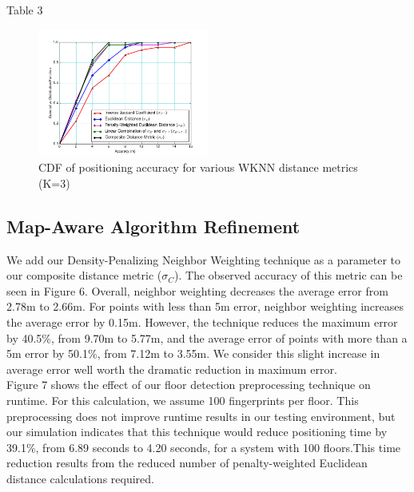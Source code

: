 \documentclass[conference]{IEEEtran}
\begin{document}
\begin{center}
Table 3
\end{center}

\begin{figure}[h!]
  \centering
    \includegraphics[width=0.5\textwidth]{distance_comparison.png}
    \caption{CDF of positioning accuracy for various WKNN distance metrics (K=3)}
\end{figure}


\subsection{Map-Aware Algorithm Refinement}

We add our Density-Penalizing Neighbor Weighting technique as a parameter to our composite distance metric ($\sigma_C$). The observed accuracy of this metric can be seen in Figure 6. Overall, neighbor weighting decreases the average error from 2.78m to 2.66m. For points with less than 5m error, neighbor weighting increases the average error by 0.15m. However, the technique reduces the maximum error by 40.5\%, from 9.70m to 5.77m, and the average error of points with more than a 5m error by 50.1\%, from 7.12m to 3.55m. We consider this slight increase in average error well worth the dramatic reduction in maximum error.\\		
\indent Figure 7 shows the effect of our floor detection preprocessing technique on runtime. For this calculation, we assume 100 fingerprints per floor. This preprocessing does not improve runtime results in our testing environment, but our simulation indicates that this technique would reduce positioning time by 39.1\%, from 6.89 seconds to 4.20 seconds, for a system with 100 floors.This time reduction results from the reduced number of penalty-weighted Euclidean distance calculations required.
\end{document}
